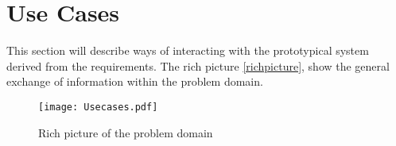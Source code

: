 \section{Use Cases}\label{sub:usecases}

This section will describe ways of interacting with the prototypical system derived from the requirements. The rich picture \cref{richpicture}, show the general exchange of information within the problem domain.

\begin{figure}
  \centering
  \begin{adjustbox}{max width=\textwidth}
    \texttt{[image: Usecases.pdf]}
  \end{adjustbox}
  \caption[Rich picture]{Rich picture of the problem domain}
  \label{fig:richpicture}
\end{figure}
